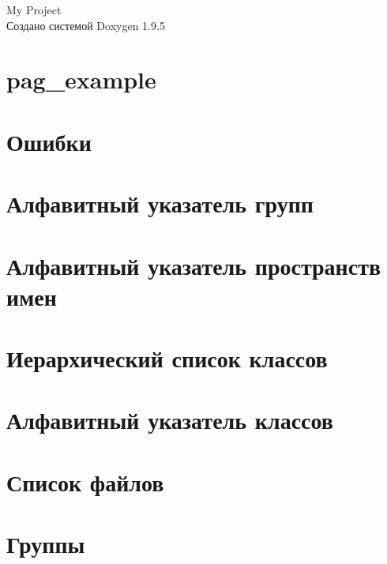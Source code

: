 \documentclass[twoside]{book}
\newcommand{\+}{\discretionary{\mbox{\scriptsize$\hookleftarrow$}}{}{}}
\newcommand{\clearemptydoublepage}{%
    \newpage{\pagestyle{empty}\cleardoublepage}%
  }
\begin{document}
  \raggedbottom
    \hypersetup{pageanchor=false,
                bookmarksnumbered=true,
                pdfencoding=unicode
               }
  \begin{titlepage}
  \vspace*{7cm}
  \begin{center}%
  {\Large My Project}\\
  \vspace*{1cm}
  {\large Создано системой Doxygen 1.9.5}\\
  \end{center}
  \end{titlepage}
  \clearemptydoublepage
  \tableofcontents
  \clearemptydoublepage
  \hypersetup{pageanchor=true}
\chapter{pag\+\_\+example}
\label{pag_example}

\chapter{Ошибки}
\label{bug}

\chapter{Алфавитный указатель групп}

\chapter{Алфавитный указатель пространств имен}

\chapter{Иерархический список классов}

\chapter{Алфавитный указатель классов}

\chapter{Список файлов}

\chapter{Группы}









\end{document}
